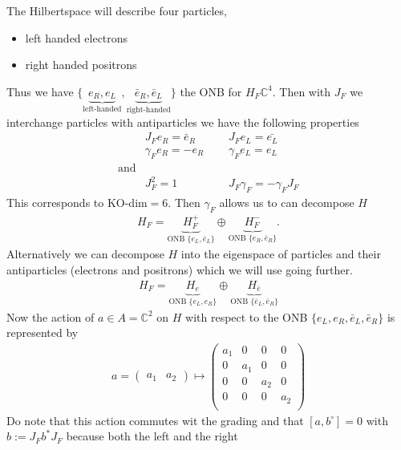 The Hilbertspace will describe four particles,
\begin{itemize}
    \item left handed electrons
    \item right handed positrons
\end{itemize}
Thus we have $\{ \underbrace{e_R, e_L}_{\text{left-handed}},
\underbrace{\bar{e}_R, \bar{e}_L}_{\text{right-handed}}\}$ the ONB for $H_F
\mathbb{C}^4$.
\newline
Then with $J_F$ we interchange particles with antiparticles we have the
following properties
\begin{align}
    &J_F e_R = \bar{e}_R \;\;\;\;\; &J_F e_L = \bar{e_L} \\
    &\gamma _F e_R = -e_R \;\;\;\;\; &\gamma_F e_L = e_L \\
    \text{and}& \nonumber \\
    &J_F^2 = 1 \;\;\;\;\; & J_F \gamma_F  = - \gamma_F J_F
\end{align}
This corresponds to KO-dim$= 6$. Then $\gamma_F$ allows us to can decompose
$H$
\begin{align}
    H_F = \underbrace{H_F^+}_{\text{ONB } \{e_L, \bar{e}_L\}}
    \oplus \underbrace{H_F^-}_{\text{ONB } \{e_R, \bar{e}_R\}}.
\end{align}
Alternatively we can decompose $H$ into the eigenspace of particles and their
antiparticles (electrons and positrons) which we will use going further.
\begin{align}
    H_F = \underbrace{H_{e}}_{\text{ONB } \{e_L, e_R\}} \oplus
    \underbrace{H_{\bar{e}}}_{\text{ONB } \{\bar{e}_L, \bar{e}_R\}}
\end{align}
Now the action of $a \in A = \mathbb{C}^2$ on $H$ with respect to the ONB
$\{e_L, e_R, \bar{e}_L, \bar{e}_R\}$ is represented by
\begin{align}
    a =
    \begin{pmatrix}a_1 & a_2 \end{pmatrix} \mapsto
        \begin{pmatrix}
            a_1 &0 &0 &0\\
             0&a_1 &0 &0\\
            0 &0 &a_2 &0\\
            0 &0 &0 &a_2\\
        \end{pmatrix}
\end{align}
Do note that this action commutes wit the grading and that
$[a, b^\circ] = 0$ with $b:= J_F b^*J_F$  because both the left and the right
